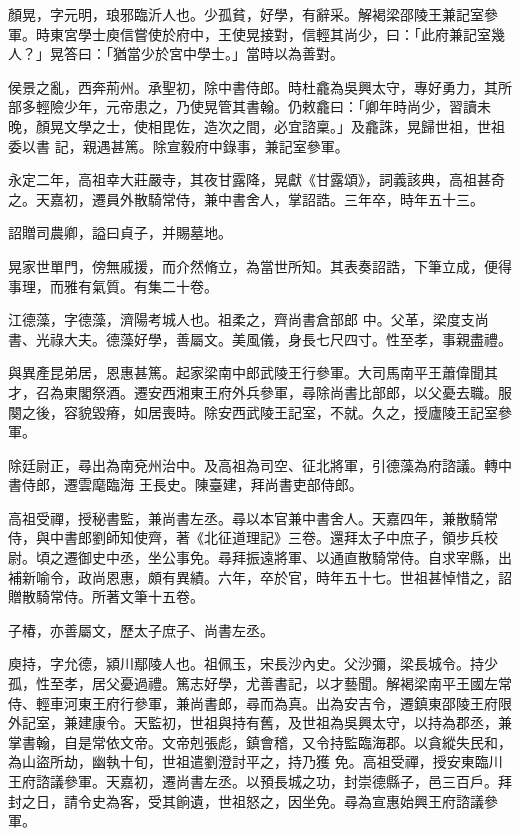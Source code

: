 \begin{pinyinscope}
 顏晃，字元明，琅邪臨沂人也。少孤貧，好學，有辭采。解褐梁邵陵王兼記室參軍。時東宮學士庾信嘗使於府中，王使晃接對，信輕其尚少，曰：「此府兼記室幾人？」晃答曰：「猶當少於宮中學士。」當時以為善對。



 侯景之亂，西奔荊州。承聖初，除中書侍郎。時杜龕為吳興太守，專好勇力，其所部多輕險少年，元帝患之，乃使晃管其書翰。仍敕龕曰：「卿年時尚少，習讀未晚，顏晃文學之士，使相毘佐，造次之間，必宜諮稟。」及龕誅，晃歸世祖，世祖委以書
 記，親遇甚篤。除宣毅府中錄事，兼記室參軍。



 永定二年，高祖幸大莊嚴寺，其夜甘露降，晃獻《甘露頌》，詞義該典，高祖甚奇之。天嘉初，遷員外散騎常侍，兼中書舍人，掌詔誥。三年卒，時年五十三。



 詔贈司農卿，謚曰貞子，并賜墓地。



 晃家世單門，傍無戚援，而介然脩立，為當世所知。其表奏詔誥，下筆立成，便得事理，而雅有氣質。有集二十卷。



 江德藻，字德藻，濟陽考城人也。祖柔之，齊尚書倉部郎
 中。父革，梁度支尚書、光祿大夫。德藻好學，善屬文。美風儀，身長七尺四寸。性至孝，事親盡禮。



 與異產昆弟居，恩惠甚篤。起家梁南中郎武陵王行參軍。大司馬南平王蕭偉聞其才，召為東閣祭酒。遷安西湘東王府外兵參軍，尋除尚書比部郎，以父憂去職。服闋之後，容貌毀瘠，如居喪時。除安西武陵王記室，不就。久之，授廬陵王記室參軍。



 除廷尉正，尋出為南兗州治中。及高祖為司空、征北將軍，引德藻為府諮議。轉中書侍郎，遷雲麾臨海
 王長史。陳臺建，拜尚書吏部侍郎。



 高祖受禪，授秘書監，兼尚書左丞。尋以本官兼中書舍人。天嘉四年，兼散騎常侍，與中書郎劉師知使齊，著《北征道理記》三卷。還拜太子中庶子，領步兵校尉。頃之遷御史中丞，坐公事免。尋拜振遠將軍、以通直散騎常侍。自求宰縣，出補新喻令，政尚恩惠，頗有異績。六年，卒於官，時年五十七。世祖甚悼惜之，詔贈散騎常侍。所著文筆十五卷。



 子椿，亦善屬文，歷太子庶子、尚書左丞。



 庾持，字允德，潁川鄢陵人也。祖佩玉，宋長沙內史。父沙彌，梁長城令。持少孤，性至孝，居父憂過禮。篤志好學，尤善書記，以才藝聞。解褐梁南平王國左常侍、輕車河東王府行參軍，兼尚書郎，尋而為真。出為安吉令，遷鎮東邵陵王府限外記室，兼建康令。天監初，世祖與持有舊，及世祖為吳興太守，以持為郡丞，兼掌書翰，自是常依文帝。文帝剋張彪，鎮會稽，又令持監臨海郡。以貪縱失民和，為山盜所劫，幽執十旬，世祖遣劉澄討平之，持乃獲
 免。高祖受禪，授安東臨川王府諮議參軍。天嘉初，遷尚書左丞。以預長城之功，封崇德縣子，邑三百戶。拜封之日，請令史為客，受其餉遺，世祖怒之，因坐免。尋為宣惠始興王府諮議參軍。




\end{pinyinscope}
